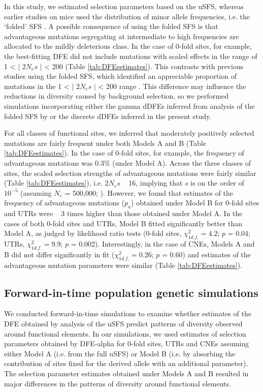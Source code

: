 	In this study, we estimated selection parameters based on the uSFS, whereas earlier studies on mice used the distribution of minor allele frequencies, i.e. the ‘folded’ SFS \citep{RN158, RN170, RN342, RN122, RN238}. A possible consequence of using the folded SFS is that advantageous mutations segregating at intermediate to high frequencies are allocated to the mildly deleterious class. In the case of 0-fold sites, for example, the best-fitting DFE did not include mutations with scaled effects in the range of 1 < $\mid$ $2N_es$ $\mid$ < 200 (Table \ref{tab:DFEestimates}). This contrasts with previous studies using the folded SFS, which identified an appreciable proportion of mutations in the 1 < $\mid$ $2N_es$ $\mid$ < 200 range \citep{RN122,RN178}. This difference may influence the reductions in diversity caused by background selection, so we performed simulations incorporating either the gamma dDFEs inferred from analysis of the folded SFS by \cite{RN122} or the discrete dDFEs inferred in the present study.
 
	For all classes of functional sites, we inferred that moderately positively selected mutations are fairly frequent under both Models A and B (Table \ref{tab:DFEestimates}). In the case of 0-fold sites, for example, the frequency of advantageous mutations was 0.3\% (under Model A). Across the three classes of sites, the scaled selection strengths of advantageous mutations were fairly similar (Table \ref{tab:DFEestimates}), i.e. $2N_es$ ~ 16, implying that $s$ is on the order of $10^{-5}$ (assuming $N_e$ = 500,000; \cite{RN315}). However, we found that estimates of the frequency of advantageous mutations ($p_a$) obtained under Model B for 0-fold sites and UTRs were ~ 3 times higher than those obtained under Model A. In the cases of both 0-fold sites and UTRs, Model B fitted significantly better than Model A, as judged by likelihood ratio tests (0-fold sites, $\chi^{2}_{1 d.f.} = 4.2$; $p$ = 0.04; UTRs, $\chi^{2}_{1 d.f.}= 9.9$; $p$ = 0.002). Interestingly, in the case of CNEs, Models A and B did not differ significantly in fit ($\chi^{2}_{1 d.f.} = 0.26$; $p$ = 0.60) and estimates of the advantageous mutation parameters were similar (Table \ref{tab:DFEestimates}). 

\subsection{Forward-in-time population genetic simulations}

        	We conducted forward-in-time simulations to examine whether estimates of the DFE obtained by analysis of the uSFS predict patterns of diversity observed around functional elements. In our simulations, we used estimates of selection parameters obtained by DFE-alpha for 0-fold sites, UTRs and CNEs assuming either Model A (i.e. from the full uSFS) or Model B (i.e. by absorbing the contribution of sites fixed for the derived allele with an additional parameter). The selection parameter estimates obtained under Models A and B resulted in major differences in the patterns of diversity around functional elements.

